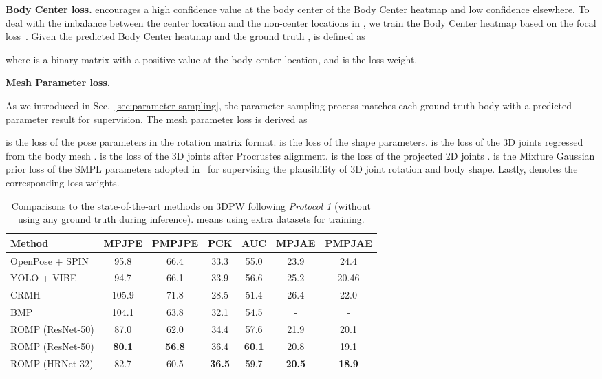 \documentclass[10pt,twocolumn,letterpaper]{article}
\begin{document}
\textbf{Body Center loss.}  encourages a high confidence value at the body center  of the Body Center heatmap  and low confidence elsewhere.
To deal with the imbalance between the center location and the non-center locations in , we train the Body Center heatmap based on the focal loss~\cite{lin2017focal}. 
Given the predicted Body Center heatmap  and the ground truth ,   is defined as 

where   is a binary matrix with a positive value at the body center location, and  is the loss weight.

\textbf{Mesh Parameter loss.} 

As we introduced in Sec.~\ref{sec:parameter sampling}, the parameter sampling process matches each ground truth body with a predicted parameter result for supervision.
The mesh parameter loss is derived as 

 is the  loss of the pose parameters in the  rotation matrix format. 
 is the  loss of the shape parameters. 
 is the  loss of the 3D joints  regressed from the body mesh .
 is the  loss of the 3D joints  after Procrustes alignment.
 is the  loss of the projected 2D joints . 
 is the Mixture Gaussian prior loss of the SMPL parameters adopted in~\cite{keep,SMPL} for supervising the plausibility of 3D joint rotation and body shape. Lastly,  denotes the corresponding loss weights.


\begin{table*}[t]
\setlength\tabcolsep{2pt}
  \centering
  {
    \begin{tabular}{l|cccccc}
    \hline
    \textbf{Method} & \textbf{MPJPE} &  \textbf{PMPJPE} &\textbf{PCK} &	\textbf{AUC} &\textbf{MPJAE} & \textbf{PMPJAE} \\
    \hline
        OpenPose + SPIN~\cite{kolotouros2019spin}&  95.8 &  66.4 &33.3 & 55.0  & 23.9 & 24.4\\
        YOLO + VIBE~\cite{kocabas2020vibe}& 94.7 & 66.1 & 33.9 & 56.6 &25.2 &20.46 \\
        CRMH~\cite{jiang2020coherent}& 105.9 &71.8 & 28.5 & 51.4 & 26.4 & 22.0\\
        BMP~\cite{zhang2021bmp} & 104.1 & 63.8 & 32.1 & 54.5 & - & - \\
        \hline
        ROMP (ResNet-50) & 87.0 & 62.0 & 34.4 & 57.6 & 21.9 & 20.1\\
        ROMP (ResNet-50) & \textbf{80.1} &  \textbf{56.8} &36.4 & \textbf{60.1} & 20.8 &19.1\\
        ROMP (HRNet-32) &82.7 & 60.5 &  \textbf{36.5} & 59.7 & \textbf{20.5} & \textbf{18.9}\\
    \hline
    \end{tabular} }
    \caption{{Comparisons to the state-of-the-art methods  on 3DPW following \textit{Protocol 1} (without using any ground truth during inference).  means using extra datasets for training.}}  \label{tab:3DPW}\end{table*}
\end{document}
